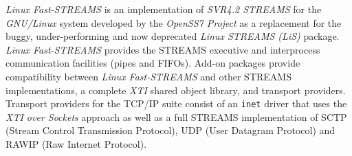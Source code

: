 \documentclass[letterpaper,final,notitlepage,twocolumn,10pt,twoside]{article}
\begin{document}
\textsl{Linux Fast-STREAMS} is an implementation of \textsl{SVR4.2 STREAMS}
for the \textsl{GNU/Linux} system developed by the \textsl{OpenSS7 Project}
\cite[]{openss7} as a replacement for the buggy, under-performing and now
deprecated \textsl{Linux STREAMS (LiS)} package.  \textsl{Linux Fast-STREAMS}
provides the STREAMS executive and interprocess communication facilities
(pipes and FIFOs).  Add-on packages provide compatibility between
\textsl{Linux Fast-STREAMS} and other STREAMS implementations, a complete
\textsl{XTI} shared object library, and transport providers.  Transport
providers for the TCP/IP suite consist of an \texttt{inet} driver that uses
the \textit{XTI over Sockets} approach as well as a full STREAMS
implementation of SCTP (Stream Control Transmission Protocol), UDP (User
Datagram Protocol) and RAWIP (Raw Internet Protocol).
\end{document}
